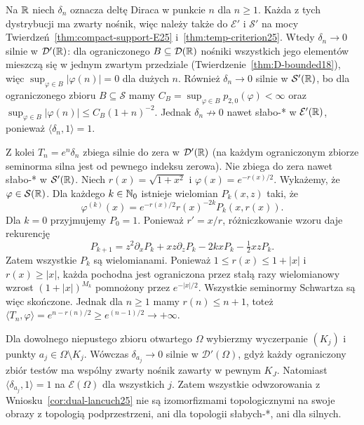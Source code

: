 \begin{przyklad}
\label{ex:escaping-deltas25}
Na $\mathbb R$ niech $\delta_n$ oznacza deltę Diraca w punkcie
$n$ dla $n\ge1$. Każda z tych dystrybucji ma zwarty
nośnik, więc należy także do $\mathcal E'$ i $\mathcal S'$
na mocy Twierdzeń~\ref{thm:compact-support-E25}
i~\ref{thm:temp-criterion25}.
Wtedy $\delta_n\to0$ silnie w $\mathcal D'(\mathbb R)$:
dla ograniczonego $B\subseteq\mathcal D(\mathbb R)$ nośniki
wszystkich jego elementów mieszczą się w jednym zwartym
przedziale (Twierdzenie~\ref{thm:D-bounded18}), więc
$\sup_{\varphi\in B}|\varphi(n)|=0$ dla dużych $n$.
Również $\delta_n\to0$ silnie w $\mathcal S'(\mathbb R)$, bo dla
ograniczonego zbioru $B\subseteq\mathcal S$ mamy
$C_B=\sup_{\varphi\in B}p_{2,0}(\varphi)<\infty$ oraz
$\sup_{\varphi\in B}|\varphi(n)|\le C_B(1+n)^{-2}$.
Jednak $\delta_n\not\to0$ nawet słabo-* w
$\mathcal E'(\mathbb R)$, ponieważ $\langle\delta_n,1\rangle=1$.

Z kolei $T_n=e^n\delta_n$ zbiega silnie do zera w
$\mathcal D'(\mathbb R)$ (na każdym ograniczonym zbiorze
seminorma silna jest od pewnego indeksu zerowa).
Nie zbiega do zera nawet słabo-* w $\mathcal S'(\mathbb R)$.
Niech $r(x)=\sqrt{1+x^2}$ i $\varphi(x)=e^{-r(x)/2}$.
Wykażemy, że $\varphi\in\mathcal S(\mathbb R)$.
Dla każdego $k\in\mathbb N_0$ istnieje wielomian $P_k(x,z)$
taki, że
\[
 \varphi^{(k)}(x)=e^{-r(x)/2}r(x)^{-2k}P_k(x,r(x)).
\]
Dla $k=0$ przyjmujemy $P_0=1$. Ponieważ $r'=x/r$,
różniczkowanie wzoru daje rekurencję
\[
 P_{k+1}=z^2\partial_x P_k+xz\partial_z P_k
          -2kxP_k-\tfrac12 xzP_k.
\]
Zatem wszystkie $P_k$ są wielomianami. Ponieważ
$1\le r(x)\le1+|x|$ i $r(x)\ge|x|$, każda pochodna
jest ograniczona przez stałą razy wielomianowy wzrost
$(1+|x|)^{M_k}$ pomnożony przez $e^{-|x|/2}$.
Wszystkie seminormy Schwartza są więc skończone.
Jednak dla $n\ge1$ mamy $r(n)\le n+1$, toteż
$\langle T_n,\varphi\rangle=e^{n-r(n)/2}
\ge e^{(n-1)/2}\to+\infty$.

Dla dowolnego niepustego zbioru otwartego $\Omega$
wybierzmy wyczerpanie $(K_j)$ i punkty
$a_j\in\Omega\setminus K_j$.
Wówczas $\delta_{a_j}\to0$ silnie w $\mathcal D'(\Omega)$,
gdyż każdy ograniczony zbiór testów ma wspólny zwarty
nośnik zawarty w pewnym $K_J$.
Natomiast $\langle\delta_{a_j},1\rangle=1$ na
$\mathcal E(\Omega)$ dla wszystkich $j$.
Zatem wszystkie odwzorowania z
Wniosku~\ref{cor:dual-lancuch25} nie są izomorfizmami
topologicznymi na swoje obrazy z topologią podprzestrzeni,
ani dla topologii słabych-*, ani dla silnych.
\end{przyklad}

